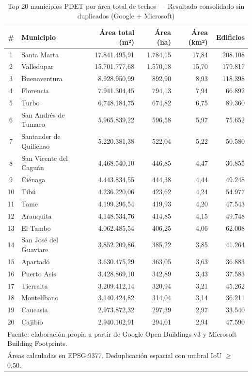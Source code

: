 \documentclass{article}
\begin{document}
\begin{table}[H]
\centering
\caption{Top 20 municipios PDET por área total de techos --- Resultado consolidado 
sin duplicados (Google + Microsoft)}
\label{tab:top20_area}
\small
\begin{tabular}{clrrrr}
\toprule
\textbf{\#} & \textbf{Municipio} & \textbf{Área total (m²)} & \textbf{Área (ha)} & 
\textbf{Área (km²)} & \textbf{Edificios} \\
\midrule
1  & Santa Marta            & 17.841.495,91 & 1.784,15 & 17,84 & 208.108 \\
2  & Valledupar             & 15.701.777,68 & 1.570,18 & 15,70 & 179.817 \\
3  & Buenaventura           &  8.928.950,99 &   892,90 &  8,93 & 118.398 \\
4  & Florencia              &  7.941.304,45 &   794,13 &  7,94 &  66.892 \\
5  & Turbo                  &  6.748.184,75 &   674,82 &  6,75 &  89.360 \\
6  & San Andrés de Tumaco   &  5.965.839,22 &   596,58 &  5,97 &  75.652 \\
7  & Santander de Quilichao &  5.220.381,38 &   522,04 &  5,22 &  50.580 \\
8  & San Vicente del Caguán &  4.468.540,10 &   446,85 &  4,47 &  36.855 \\
9  & Ciénaga                &  4.443.834,55 &   444,38 &  4,44 &  49.248 \\
10 & Tibú                   &  4.236.220,06 &   423,62 &  4,24 &  54.977 \\
11 & Tame                   &  4.199.296,54 &   419,93 &  4,20 &  47.543 \\
12 & Arauquita              &  4.148.534,76 &   414,85 &  4,15 &  49.748 \\
13 & El Tambo               &  4.062.485,54 &   406,25 &  4,06 &  62.008 \\
14 & San José del Guaviare  &  3.852.209,86 &   385,22 &  3,85 &  41.264 \\
15 & Apartadó               &  3.630.475,29 &   363,05 &  3,63 &  36.883 \\
16 & Puerto Asís            &  3.428.869,10 &   342,89 &  3,43 &  37.583 \\
17 & Tierralta              &  3.209.412,14 &   320,94 &  3,21 &  45.262 \\
18 & Montelíbano            &  3.140.424,82 &   314,04 &  3,14 &  36.211 \\
19 & Caucasia               &  2.973.872,32 &   297,39 &  2,97 &  33.540 \\
20 & Cajibío                &  2.940.102,91 &   294,01 &  2,94 &  47.590 \\
\bottomrule
\multicolumn{6}{l}{\footnotesize Fuente: elaboración propia a partir de Google Open 
Buildings v3 y Microsoft Building Footprints.} \\
\multicolumn{6}{l}{\footnotesize Áreas calculadas en EPSG:9377. Deduplicación 
espacial con umbral IoU $\geq$ 0,50.} \\
\end{tabular}
\end{table}
\end{document}
